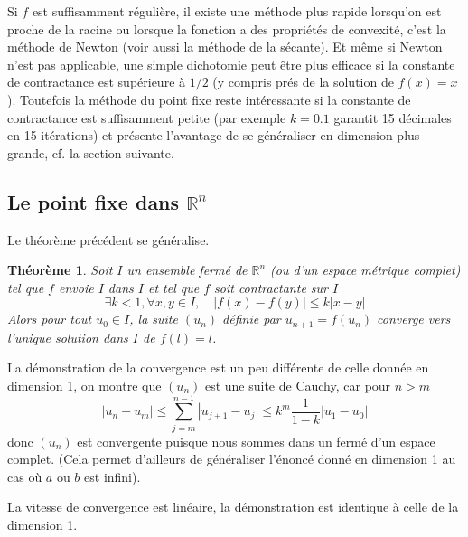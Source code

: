 \documentclass[a4paper,11pt]{article}
\newtheorem{thm}{Théorème}
\begin{document}
\begin{giacjshere}
Si $f$ est suffisamment r\'eguli\`ere,
il existe une méthode plus rapide lorsqu'on est proche de la racine ou lorsque
la fonction a des propriétés de convexité, c'est la méthode de Newton
(voir aussi la m\'ethode de la s\'ecante).
Et m\^eme si Newton n'est pas applicable, une simple dichotomie
peut \^etre plus efficace si la constante de contractance est 
sup\'erieure \`a $1/2$ (y compris pr\'es de la solution de $f(x)=x$).
Toutefois la m\'ethode du point fixe reste int\'eressante si la
constante de contractance est suffisamment petite (par exemple $k=0.1$
garantit 15 d\'ecimales en 15 it\'erations) et pr\'esente l'avantage
de se g\'en\'eraliser en dimension plus grande, cf. la section suivante.

\subsection{Le point fixe dans $\mathbb{R}^n$}
Le th\'eor\`eme pr\'ec\'edent se g\'en\'eralise. 
\begin{thm}
Soit $I$ un ensemble
ferm\'e de $\mathbb{R}^n$ (ou d'un espace m\'etrique complet) tel que $f$ 
envoie $I$ dans $I$ et tel que $f$ soit contractante sur $I$
$$ \exists k<1, \forall x,y \in I, \quad |f(x)-f(y)| \leq k |x-y|$$
Alors pour tout $u_0 \in I$, la suite $(u_n)$ d\'efinie par
$u_{n+1}=f(u_n)$ converge vers l'unique solution dans $I$ de $f(l)=l$.
\end{thm}
La d\'emonstration de la convergence est un peu diff\'erente de celle 
donn\'ee en
dimension 1, on montre que $(u_n)$ est une suite de Cauchy, car pour $n>m$
$$ |u_n-u_m| \leq \sum_{j=m}^{n-1}|u_{j+1}-u_j | 
\leq k^m \frac{1}{1-k} |u_1-u_0| $$
donc $(u_n)$ est convergente puisque nous sommes dans un ferm\'e 
d'un espace complet. (Cela permet d'ailleurs de g\'en\'eraliser 
l'\'enonc\'e donn\'e en dimension 1 au cas o\`u $a$ ou $b$ est infini).

La vitesse de convergence est lin\'eaire, la d\'emonstration est
identique \`a celle de la dimension 1.


\end{giacjshere}
\end{document}
